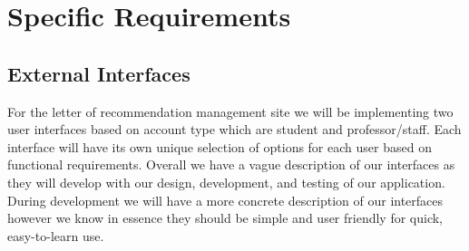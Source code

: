 \documentclass[onecolumn, draftclsnofoot,10pt, compsoc]{IEEEtran}
\begin{document}
\section{Specific Requirements}
\subsection{External Interfaces}
For the letter of recommendation management site we will be implementing two user interfaces based on account type which are student and professor/staff. Each interface will have its own unique selection of options for each user based on functional requirements. Overall we have a vague description of our interfaces as they will develop with our design, development, and testing of our application. During development we will have a more concrete description of our interfaces however we know in essence they should be simple and user friendly for quick, easy-to-learn use. 
\end{document}
